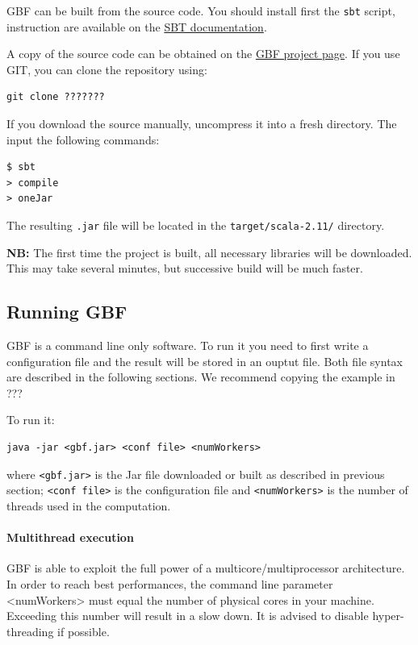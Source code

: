 \documentclass[10pt,a4paper]{article}
\begin{document}
GBF can be built from the source code. You should install first the
\texttt{sbt} script, instruction are available on the \href{http://www.scala-sbt.org/0.13/tutorial/Manual-Installation.html}{SBT documentation}.

A copy of the source code can be obtained on the \href{http://example}{GBF project page}. If
you use GIT, you can clone the repository using:

\begin{verbatim}
git clone ???????
\end{verbatim}

If you download the source manually, uncompress it into a fresh directory. The
input the following commands:

\begin{verbatim}
$ sbt
> compile
> oneJar
\end{verbatim}

The resulting \texttt{.jar} file will be located in the \texttt{target/scala-2.11/}
directory.

\textbf{NB:} The first time the project is built, all necessary libraries
will be downloaded. This may take several minutes, but successive
build will be much faster.

\subsection{Running GBF}
\label{sec-3}

GBF is a command line only software. To run it you need to first write
a configuration file and the result will be stored in an ouptut file.
Both file syntax are described in the following sections. We recommend
copying the example in ???

To run it:

\begin{verbatim}
java -jar <gbf.jar> <conf file> <numWorkers>
\end{verbatim}

where \texttt{<gbf.jar>} is the Jar file downloaded or built as described in
previous section; \texttt{<conf file>} is the configuration file and
\texttt{<numWorkers>} is the number of threads used in the computation.

\paragraph{Multithread execution}
\label{sec-3-1}

GBF is able to exploit the full power of a multicore/multiprocessor
architecture. In order to reach best performances, the command line
parameter <numWorkers> must equal the number of physical cores in your
machine. Exceeding this number will result in a slow down. It is
advised to disable hyper-threading if possible.
\end{document}
